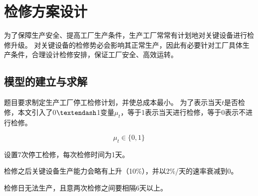 \section{检修方案设计} %
\label{sec:检修方案设计}

为了保障生产安全、提高工厂生产条件，生产工厂常常有计划地对关键设备进行检修升级。
对关键设备的检修势必会影响其正常生产，因此有必要针对工厂具体生产条件，合理设计检修安排，保证工厂安全、高效运转。

\subsection{模型的建立与求解} %
\label{sub:模型的建立与求解}

题目要求制定生产工厂停工检修计划，并使总成本最小。
为了表示当天$t$是否检修，本文引入了0$\textendash$1变量$\mu_t$，等于1表示当天进行检修，等于0表示不进行检修。

\begin{equation}
	\mu_{t} \in\{0,1\}
\end{equation}

设置7次停工检修，每次检修时间为1天。

检修之后关键设备生产能力会略有上升（10\%），并以2\%/天的速率衰减到0。

检修日无法生产，且意两次检修之间要相隔6天以上。
